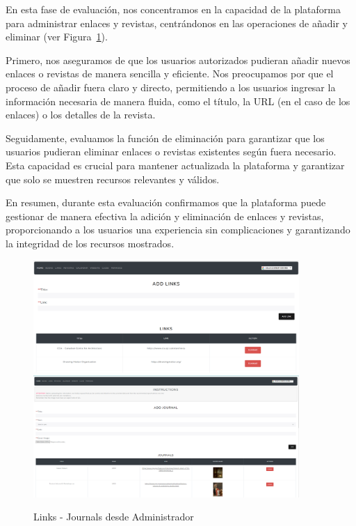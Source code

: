 \documentclass[a4paper, 12pt]{book}
\begin{document}
En esta fase de evaluación, nos concentramos en la capacidad de la plataforma para administrar enlaces y revistas, centrándonos en las operaciones de 
añadir y eliminar (ver Figura~\ref{fig:journadmin}).

Primero, nos aseguramos de que los usuarios autorizados pudieran añadir nuevos enlaces o revistas de manera sencilla y eficiente. Nos preocupamos por 
que el proceso de añadir fuera claro y directo, permitiendo a los usuarios ingresar la información necesaria de manera fluida, como el título, la URL 
(en el caso de los enlaces) o los detalles de la revista.

Seguidamente, evaluamos la función de eliminación para garantizar que los usuarios pudieran eliminar enlaces o revistas existentes según fuera necesario. 
Esta capacidad es crucial para mantener actualizada la plataforma y garantizar que solo se muestren recursos relevantes y válidos.

En resumen, durante esta evaluación confirmamos que la plataforma puede gestionar de manera efectiva la adición y eliminación de enlaces y revistas, 
proporcionando a los usuarios una experiencia sin complicaciones y garantizando la integridad de los recursos mostrados.

\begin{figure}
  \centering
  \includegraphics[width=0.9\textwidth]{img/linksadmin.png}
  \includegraphics[width=0.9\textwidth]{img/linksadmin1.png}
  \caption{Links - Journals desde Administrador}
  \label{fig:journadmin}
\end{figure}
\end{document}
